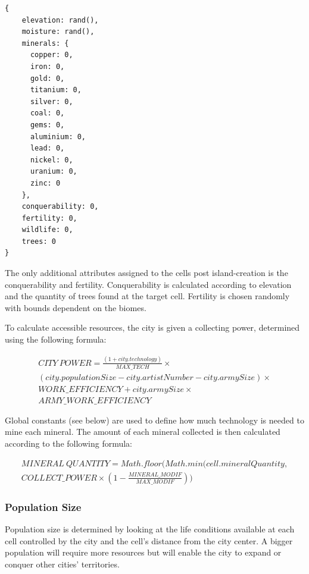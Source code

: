 \begin{lstlisting}[caption=JSON Cell Item]
  {
    elevation: rand(),
    moisture: rand(),
    minerals: {
      copper: 0,
      iron: 0,
      gold: 0,
      titanium: 0,
      silver: 0,
      coal: 0,
      gems: 0,
      aluminium: 0,
      lead: 0,
      nickel: 0,
      uranium: 0,
      zinc: 0
    },
    conquerability: 0,
    fertility: 0,
    wildlife: 0,
    trees: 0
}
\end{lstlisting}

The only additional attributes assigned to the cells post island-creation is the conquerability and fertility. Conquerability is calculated according to elevation and the quantity of trees found at the target cell. Fertility is chosen randomly with bounds dependent on the biomes.

To calculate accessible resources, the city is given a collecting power, determined using the following formula:

\begin{equation}
\begin{split}
CITY\ POWER = \frac{(1+city.technology)}{MAX\_TECH} \times \\ (city.populationSize - city.artistNumber - city.armySize) \times \\ WORK\_EFFICIENCY + city.armySize \times \\ARMY\_WORK\_EFFICIENCY
\end{split}
\end{equation}

Global constants (see below) are used to define how much technology is needed to mine each mineral. The amount of each mineral collected is then calculated according to the following formula:

\begin{equation}
\begin{split}
MINERAL\ QUANTITY = Math.floor(Math.min(cell.mineralQuantity, \\ COLLECT\_POWER \times (1 - \frac{MINERAL\_MODIF}{MAX\_MODIF}))
\end{split}
\end{equation}

\subsubsection{Population Size}
Population size is determined by looking at the life conditions available at each cell controlled by the city and the cell's distance from the city center. A bigger population will require more resources but will enable the city to expand or conquer other cities' territories.

